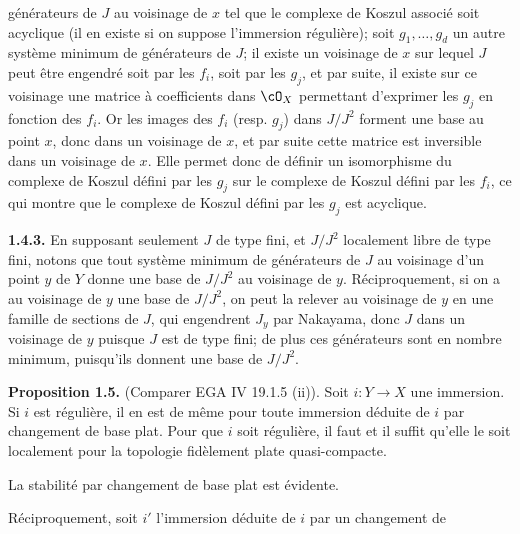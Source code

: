 générateurs de $J$ au voisinage de $x$ tel que le complexe de Koszul associé soit acyclique (il en existe si on suppose l'immersion régulière); soit $g_1,\ldots,g_d$ un autre système minimum de générateurs de $J$; il existe un voisinage de $x$ sur lequel $J$ peut être engendré soit par les $f_i$, soit par les $g_j$, et par suite, il existe sur ce voisinage une matrice à coefficients dans $\cO_X$ permettant d'exprimer les $g_j$ en fonction des $f_i$. Or les images des $f_i$ (resp. $g_j$) dans $J/J^2$ forment une base au point $x$, donc dans un voisinage de $x$, et par suite cette matrice est inversible dans un voisinage de $x$. Elle permet donc de définir un isomorphisme du complexe de Koszul défini par les $g_j$ sur le complexe de Koszul défini par les $f_i$, ce qui montre que le complexe de Koszul défini par les $g_j$ est acyclique.

\textbf{1.4.3.} En supposant seulement $J$ de type fini, et $J/J^2$ localement libre de type fini, notons que tout système minimum de générateurs de $J$ au voisinage d'un point $y$ de $Y$ donne une base de $J/J^2$ au voisinage de $y$. Réciproquement, si on a au voisinage de $y$ une base de $J/J^2$, on peut la relever au voisinage de $y$ en une famille de sections de $J$, qui engendrent $J_y$ par Nakayama, donc $J$ dans un voisinage de $y$ puisque $J$ est de type fini; de plus ces générateurs sont en nombre minimum, puisqu'ils donnent une base de $J/J^2$.

\textbf{Proposition 1.5.} (Comparer EGA IV 19.1.5 (ii)). Soit $i:Y\longrightarrow X$ une immersion. Si $i$ est régulière, il en est de même pour toute immersion déduite de $i$ par changement de base plat. Pour que $i$ soit régulière, il faut et il suffit qu'elle le soit localement pour la topologie fidèlement plate quasi-compacte.

La stabilité par changement de base plat est évidente.

Réciproquement, soit $i'$ l'immersion déduite de $i$ par un changement de
